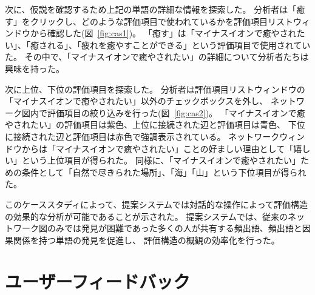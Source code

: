\documentclass[syuuron]{kuee}
\begin{document}
	次に、仮説を確認するため上記の単語の詳細な情報を探索した。
	分析者は「癒す」をクリックし、どのような評価項目で使われているかを評価項目リストウィンドウから確認した(図~\ref{fig:cas1})。
	「癒す」は「マイナスイオンで癒やされたい」、「癒される」、「疲れを癒やすことができる」という評価項目で使用されていた。
	その中で、「マイナスイオンで癒やされたい」の詳細について分析者たちは興味を持った。
	
	次に上位、下位の評価項目を探索した。
	分析者は評価項目リストウィンドウの「マイナスイオンで癒やされたい」以外のチェックボックスを外し、
	ネットワーク図内で評価項目の絞り込みを行った(図~\ref{fig:cas2})。
	「マイナスイオンで癒やされたい」の評価項目は紫色、上位に接続された辺と評価項目は青色、
	下位に接続された辺と評価項目は赤色で強調表示されている。
	ネットワークウィンドウからは「マイナスイオンで癒やされたい」ことの好ましい理由として「嬉しい」という上位項目が得られた。
	同様に、「マイナスイオンで癒やされたい」ための条件として「自然で尽きられた場所」、「海」「山」という下位項目が得られた。
	
	このケーススタディによって、提案システムでは対話的な操作によって評価構造の効果的な分析が可能であることが示された。
	提案システムでは、従来のネットワーク図のみでは発見が困難であった多くの人が共有する頻出語、頻出語と因果関係を持つ単語の発見を促進し、
	評価構造の概観の効率化を行った。
	
	\section{ユーザーフィードバック}
\end{document}
